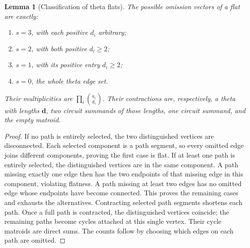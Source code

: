\documentclass[12pt]{amsart}
\newtheorem{lem}[thm]{Lemma}
\theoremstyle{definition}
\theoremstyle{remark}
\numberwithin{equation}{section}
\begin{document}
\begin{samepage}
\begin{lem}[Classification of theta flats]\label{en-theta-flats}
The possible omission vectors of a flat are exactly:
\begin{enumerate}
\item $s=3$, with each positive $d_i$ arbitrary;
\item $s=2$, with both positive $d_i\geq2$;
\item $s=1$, with its positive entry $d_i\geq2$;
\item $s=0$, the whole theta edge set.
\end{enumerate}
Their multiplicities are $\prod_i\binom{a_i}{d_i}$. Their contractions are, respectively, a theta with lengths $\boldsymbol d$, two circuit summands of those lengths, one circuit summand, and the empty matroid.
\end{lem}
\end{samepage}
\begin{proof}
If no path is entirely selected, the two distinguished vertices are disconnected. Each selected component is a path segment, so every omitted edge joins different components, proving the first case is flat. If at least one path is entirely selected, the distinguished vertices are in the same component. A path missing exactly one edge then has the two endpoints of that missing edge in this component, violating flatness. A path missing at least two edges has no omitted edge whose endpoints have become connected. This proves the remaining cases and exhausts the alternatives. Contracting selected path segments shortens each path. Once a full path is contracted, the distinguished vertices coincide; the remaining paths become cycles attached at this single vertex. Their cycle matroids are direct sums. The counts follow by choosing which edges on each path are omitted.
\end{proof}
\end{document}
